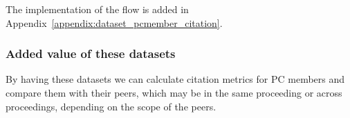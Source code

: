 \documentclass{ou-report}
\newcommand{\doi}{{DOI}}
\newcommand{\dblp}{DBLP}
\begin{document}

The implementation of the flow is added in 
Appendix~\ref{appendix:dataset_pcmember_citation}.

\subsubsection{Added value of these datasets}
By having these datasets we can calculate citation metrics for 
PC members and 
compare them with their peers, which may be in the same proceeding or across 
proceedings, depending on the scope of the peers.


\end{document}
